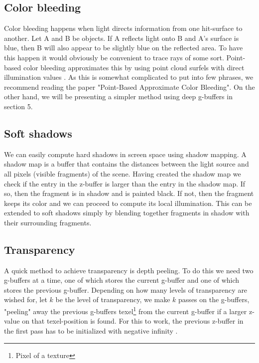 \documentclass{ACGSeminar}
\begin{document}
	\subsection{Color bleeding}
		Color bleeding happens when light directs information from one hit-surface to another. Let A and B be objects. If A reflects light onto B and A's surface is blue, then B will also appear
		to be slightly blue on the reflected area. To have this happen it would obviously be convenient to trace rays of some sort. Point-based color bleeding approximates this by using point cloud surfels with direct illumination values \cite{PBCB}. As this is somewhat complicated to put into few phrases, we recommend reading the paper "Point-Based Approximate Color Bleeding". On the other hand, we will be presenting a simpler method using deep g-buffers in section 5.

	\subsection{Soft shadows}
		We can easily compute hard shadows in screen space using shadow mapping. A shadow map is a buffer that contains the distances between the light source and all pixels (visible fragments) of the scene. Having created the shadow map we check if the entry in the z-buffer is larger than the entry in the shadow map. If so, then the fragment is in shadow and is painted black. If not, then the fragment keeps its color and we can proceed to compute its local illumination. This can be extended to soft shadows simply by blending together fragments in shadow with their surrounding fragments.

	\subsection{Transparency}
		A quick method to achieve transparency is depth peeling. To do this we need two g-buffers at a time, one of which stores the current g-buffer and one of which stores the previous g-buffer. Depending on how many levels of transparency are wished for, let $k$ be the level of transparency, we make $k$ passes on the g-buffers, "peeling" away the previous g-buffers texel\footnote{Pixel of a texture} from the current g-buffer if a larger z-value on that texel-position is found. For this to work, the previous z-buffer in the first pass has to be initialized with negative infinity \cite{NOIT}.
\end{document}
